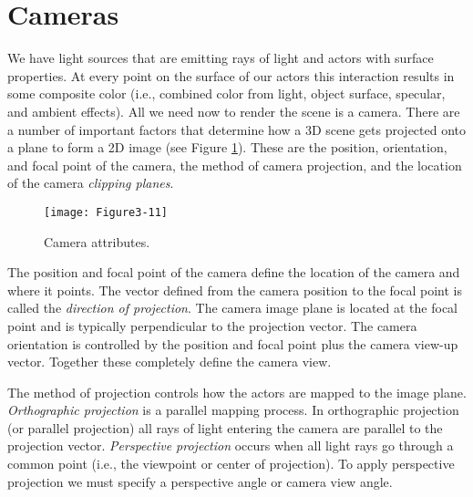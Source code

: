 \section{Cameras}
\label{sec:cameras}

We have light sources that are emitting rays of light and actors with surface properties. At every point on the surface of our actors this interaction results in some composite color (i.e., combined color from light, object surface, specular, and ambient effects). All we need now to render the scene is a camera. There are a number of important factors that determine how a 3D scene gets projected onto a plane to form a 2D image (see Figure \ref{fig:Figure3-11}). These are the position, orientation, and focal point of the camera, the method of camera projection, and the location of the camera \emph{clipping planes}.

\begin{figure}[!htb]
  \centering
  \texttt{[image: Figure3-11]}\\
  \caption{Camera attributes.}\label{fig:Figure3-11}
\end{figure}

The position and focal point of the camera define the location of the camera and where it points. The vector defined from the camera position to the focal point is called the \emph{direction of projection}. The camera image plane is located at the focal point and is typically perpendicular to the projection vector. The camera orientation is controlled by the position and focal point plus the camera view-up vector. Together these completely define the camera view.

The method of projection controls how the actors are mapped to the image plane. \emph{Orthographic projection} is a parallel mapping process. In orthographic projection (or parallel projection) all rays of light entering the camera are parallel to the projection vector. \emph{Perspective projection} occurs when all light rays go through a common point (i.e., the viewpoint or center of projection). To apply perspective projection we must specify a perspective angle or camera view angle.

